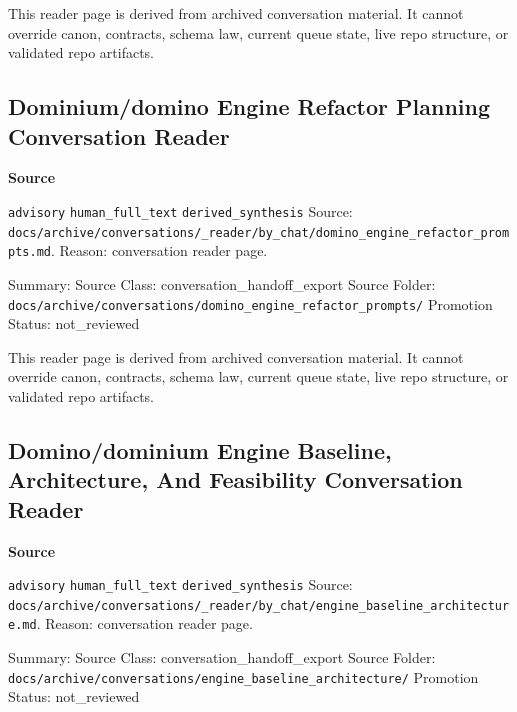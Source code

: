\documentclass[9pt,a4paper,openany]{book}
\newcommand{\vonecallout}[3]{\par\medskip\noindent\begingroup\setlength{\fboxsep}{7pt}\colorbox{DomCalloutBg}{\parbox{0.94\linewidth}{\textbf{\textcolor{#1}{#2}}\par #3}}\endgroup\par\medskip}
\begin{document}
This reader page is derived from archived conversation material.\allowbreak{} It cannot override canon, contracts, schema law, current queue state, live repo structure, or validated repo artifacts.\allowbreak{}



\subsection{Dominium/domino Engine Refactor Planning Conversation Reader}

\vonecallout{DomSlate}{Source}{\texttt{advisory} \texttt{human\_\allowbreak{}full\_\allowbreak{}text} \texttt{derived\_\allowbreak{}synthesis} Source: \texttt{docs/\allowbreak{}archive/\allowbreak{}conversations/\allowbreak{}\_\allowbreak{}reader/\allowbreak{}by\_\allowbreak{}chat/\allowbreak{}domino\_\allowbreak{}engine\_\allowbreak{}refactor\_\allowbreak{}prompts.\allowbreak{}md}.\allowbreak{} Reason: conversation reader page.\allowbreak{}}

Summary: Source Class: conversation\_\allowbreak{}handoff\_\allowbreak{}export Source Folder: \texttt{docs/\allowbreak{}archive/\allowbreak{}conversations/\allowbreak{}domino\_\allowbreak{}engine\_\allowbreak{}refactor\_\allowbreak{}prompts/\allowbreak{}} Promotion Status: not\_\allowbreak{}reviewed


This reader page is derived from archived conversation material.\allowbreak{} It cannot override canon, contracts, schema law, current queue state, live repo structure, or validated repo artifacts.\allowbreak{}



\subsection{Domino/dominium Engine Baseline, Architecture, And Feasibility Conversation Reader}

\vonecallout{DomSlate}{Source}{\texttt{advisory} \texttt{human\_\allowbreak{}full\_\allowbreak{}text} \texttt{derived\_\allowbreak{}synthesis} Source: \texttt{docs/\allowbreak{}archive/\allowbreak{}conversations/\allowbreak{}\_\allowbreak{}reader/\allowbreak{}by\_\allowbreak{}chat/\allowbreak{}engine\_\allowbreak{}baseline\_\allowbreak{}architecture.\allowbreak{}md}.\allowbreak{} Reason: conversation reader page.\allowbreak{}}

Summary: Source Class: conversation\_\allowbreak{}handoff\_\allowbreak{}export Source Folder: \texttt{docs/\allowbreak{}archive/\allowbreak{}conversations/\allowbreak{}engine\_\allowbreak{}baseline\_\allowbreak{}architecture/\allowbreak{}} Promotion Status: not\_\allowbreak{}reviewed
\end{document}

